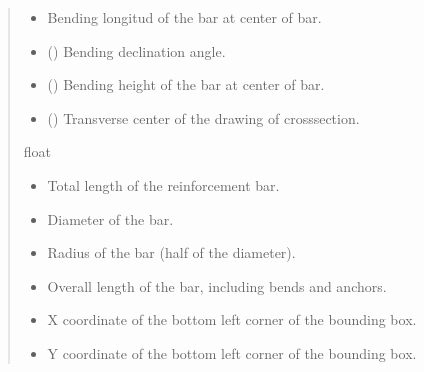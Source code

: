 \documentclass[a4paper,10pt,english]{sphinxmanual}
\begin{document}
\begin{fulllineitems}
\begin{quote}
\begin{description}
\begin{itemize}
\item {} 
\sphinxAtStartPar
{} \textendash{} Bending longitud of the bar at center of bar.

\item {} 
\sphinxAtStartPar
{} () \textendash{} Bending declination angle.

\item {} 
\sphinxAtStartPar
{} () \textendash{} Bending height of the bar at center of bar.

\item {} 
\sphinxAtStartPar
{} () \textendash{} Transverse center of the drawing of cross\sphinxhyphen{}section.

\end{itemize}

\sphinxAtStartPar
float

\begin{itemize}
\item {} 
\sphinxAtStartPar
{} \textendash{} Total length of the reinforcement bar.

\item {} 
\sphinxAtStartPar
{} \textendash{} Diameter of the bar.

\item {} 
\sphinxAtStartPar
{} \textendash{} Radius of the bar (half of the diameter).

\item {} 
\sphinxAtStartPar
{} \textendash{} Overall length of the bar, including bends and anchors.

\item {} 
\sphinxAtStartPar
{} \textendash{} X coordinate of the bottom left corner of the bounding box.

\item {} 
\sphinxAtStartPar
{} \textendash{} Y coordinate of the bottom left corner of the bounding box.


\end{itemize}
\end{description}
\end{quote}
\end{fulllineitems}
\end{document}
